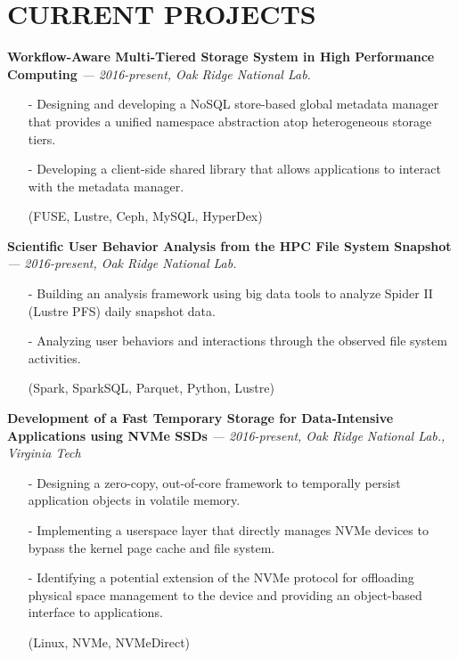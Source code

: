\section{CURRENT PROJECTS}
\vspace{.03in}
  {\bf Workflow-Aware Multi-Tiered Storage System in High Performance Computing}
   {\it \footnotesize --- 2016-present, Oak Ridge National Lab.}
   \begin{itemize}[leftmargin=*]
    \setlength\itemsep{-0.02in}
    \item[-] Designing and developing a NoSQL store-based global metadata manager
	     that provides a unified namespace abstraction atop heterogeneous
	     storage tiers.
    \item[-] Developing a client-side shared library that allows applications to interact
             with the metadata manager.
    \item[] {\small(FUSE, Lustre, Ceph, MySQL, HyperDex)}
   \end{itemize}
  \vspace{-0.15in}
  {\bf Scientific User Behavior Analysis from the HPC File System Snapshot}
   {\it \footnotesize --- 2016-present, Oak Ridge National Lab.}
   \begin{itemize}[leftmargin=*]
    \setlength\itemsep{-0.02in}
    \item[-] Building an analysis framework using big data tools to analyze Spider II (Lustre PFS) daily snapshot data.
    \item[-] Analyzing user behaviors and interactions through the observed file system activities.
    \item[] {\small(Spark, SparkSQL, Parquet, Python, Lustre)}
   \end{itemize}
  \vspace{-0.15in}
  {\bf Development of a Fast Temporary Storage for Data-Intensive Applications using NVMe SSDs}
   {\it \footnotesize --- 2016-present, Oak Ridge National Lab., Virginia Tech}
   \begin{itemize}[leftmargin=*]
    \setlength\itemsep{-0.02in}
    \item[-] Designing a zero-copy, out-of-core framework to temporally persist
             application objects in volatile memory.
    \item[-] Implementing a userspace layer that directly manages NVMe
             devices to bypass the kernel page cache and file system.
    \item[-] Identifying a potential extension of the NVMe protocol 
             for offloading physical space management to the device and
             providing an object-based interface to applications.
    \item[] {\small(Linux, NVMe, NVMeDirect)}
   \end{itemize}
 
